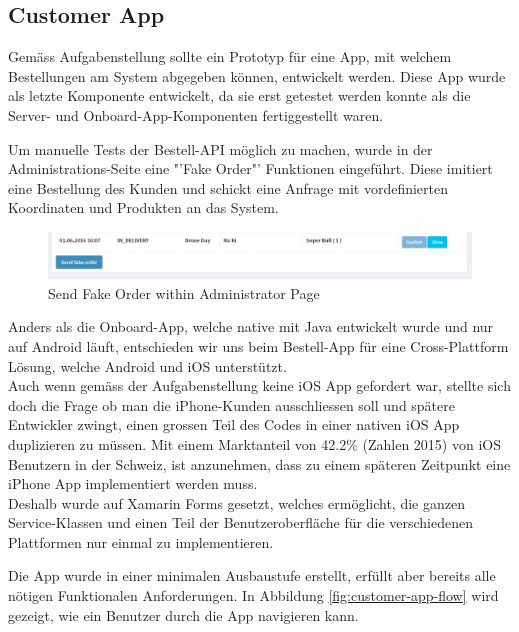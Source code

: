 \subsection{Customer App}
Gemäss Aufgabenstellung sollte ein Prototyp für eine App, mit welchem Bestellungen am System abgegeben können, entwickelt werden.
Diese App wurde als letzte Komponente entwickelt, da sie erst getestet werden konnte als die Server- und Onboard-App-Komponenten fertiggestellt waren.

Um manuelle Tests der Bestell-API möglich zu machen, wurde in der Administrations-Seite eine "'Fake Order"' Funktionen eingeführt. 
Diese imitiert eine Bestellung des Kunden und schickt eine Anfrage mit vordefinierten Koordinaten und Produkten an das System.

\begin{figure}[H]
	\centering
	\includegraphics[width=1\textwidth] {images/customer-app-fake-order.png}
	\caption{Send Fake Order within Administrator Page}
\end{figure}

Anders als die Onboard-App, welche native mit Java entwickelt wurde und nur auf Android läuft, entschieden wir uns beim Bestell-App für eine Cross-Plattform Lösung, welche Android und iOS unterstützt. \\

Auch wenn gemäss der Aufgabenstellung keine iOS App gefordert war, stellte sich doch die Frage ob man die iPhone-Kunden ausschliessen soll und spätere Entwickler zwingt, einen grossen Teil des Codes in einer nativen iOS App duplizieren zu müssen. Mit einem Marktanteil von 42.2\% (Zahlen 2015) \cite{ios-user} von iOS Benutzern in der Schweiz, ist anzunehmen, dass zu einem späteren Zeitpunkt eine iPhone App implementiert werden muss.\\

Deshalb wurde auf Xamarin Forms gesetzt, welches ermöglicht, die ganzen Service-Klassen und einen Teil der Benutzeroberfläche für die verschiedenen Plattformen nur einmal zu implementieren.

Die App wurde in einer minimalen Ausbaustufe erstellt, erfüllt aber bereits alle nötigen Funktionalen Anforderungen. In Abbildung \ref{fig:customer-app-flow} wird gezeigt, wie ein Benutzer durch die App navigieren kann. 

